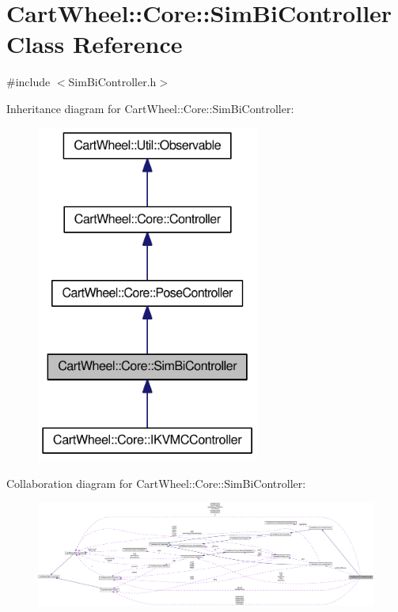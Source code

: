\hypertarget{classCartWheel_1_1Core_1_1SimBiController}{
\section{CartWheel::Core::SimBiController Class Reference}
\label{classCartWheel_1_1Core_1_1SimBiController}
}


{\ttfamily \#include $<$SimBiController.h$>$}



Inheritance diagram for CartWheel::Core::SimBiController:\nopagebreak
\begin{figure}[H]
\begin{center}
\leavevmode
\includegraphics[width=208pt]{classCartWheel_1_1Core_1_1SimBiController__inherit__graph}
\end{center}
\end{figure}


Collaboration diagram for CartWheel::Core::SimBiController:\nopagebreak
\begin{figure}[H]
\begin{center}
\leavevmode
\includegraphics[width=400pt]{classCartWheel_1_1Core_1_1SimBiController__coll__graph}
\end{center}
\end{figure}
